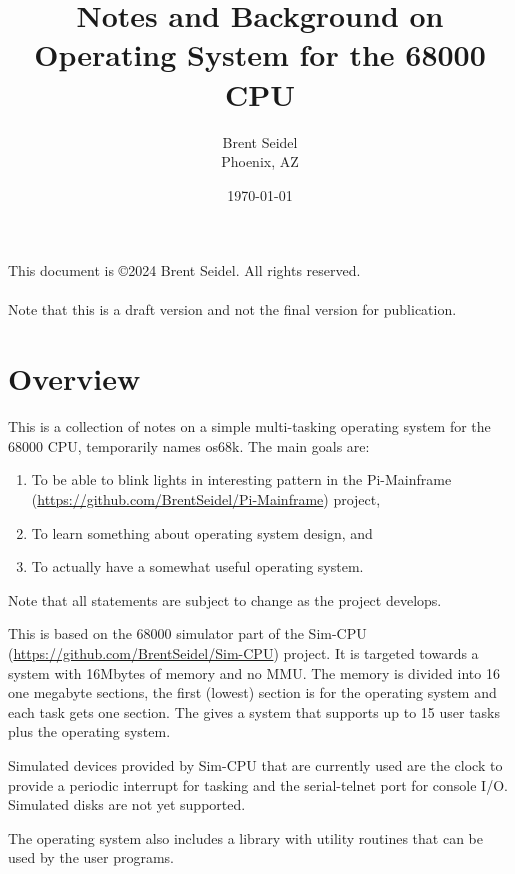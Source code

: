 \documentclass[10pt]{article}
\title{Notes and Background on Operating System for the 68000 CPU}
\author{Brent Seidel \\ Phoenix, AZ}
\date{ \today }
\begin{document}
\maketitle
\begin{center}
This document is \copyright 2024 Brent Seidel.  All rights reserved.

\paragraph{}Note that this is a draft version and not the final version for publication.
\end{center}
\tableofcontents

\section{Overview}

This is a collection of notes on a simple multi-tasking operating system for the 68000 CPU, temporarily names os68k.  The main goals are:
\begin{enumerate}
  \item To be able to blink lights in interesting pattern in the Pi-Mainframe (\url{https://github.com/BrentSeidel/Pi-Mainframe}) project,
  \item To learn something about operating system design, and
  \item To actually have a somewhat useful operating system.
\end{enumerate}

Note that all statements are subject to change as the project develops.

This is based on the 68000 simulator part of the Sim-CPU (\url{https://github.com/BrentSeidel/Sim-CPU}) project.  It is targeted towards a system with 16Mbytes of memory and no MMU.  The memory is divided into 16 one megabyte sections, the first (lowest) section is for the operating system and each task gets one section.  The gives a system that supports up to 15 user tasks plus the operating system.

Simulated devices provided by Sim-CPU that are currently used are the clock to provide a periodic interrupt for tasking and the serial-telnet port for console I/O.  Simulated disks are not yet supported.

The operating system also includes a library with utility routines that can be used by the user programs.
\end{document}
